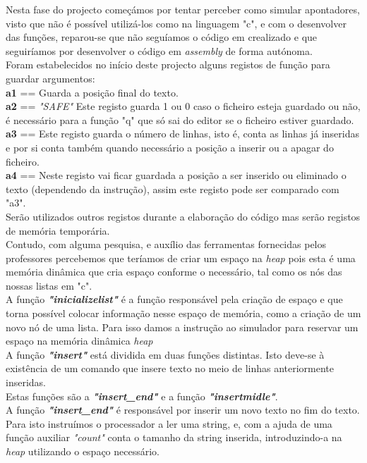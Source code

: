 \documentclass[letterpaper,12pt]{article}
\begin{document}
Nesta fase do projecto começámos por tentar perceber como simular apontadores, visto que não é possível utilizá-los como na linguagem "c", e com o desenvolver das funções, reparou-se que não seguíamos o código em c\newline realizado e que seguiríamos por desenvolver o código em \emph{assembly} de forma autónoma.\\
Foram estabelecidos no início deste projecto alguns registos de função para guardar argumentos:\\
\textbf{a1} == Guarda a posição final do texto.\\
\textbf{a2} == \emph{"SAFE"} Este registo guarda 1 ou 0 caso o ficheiro esteja guardado ou não, é necessário para a função "q" que só sai do editor se o ficheiro estiver guardado.\\
\textbf{a3} == Este registo guarda o número de linhas, isto é, conta as linhas já inseridas e por si conta também quando necessário a posição a inserir ou a apagar do ficheiro.\\
\textbf{a4} == Neste registo vai ficar guardada a posição a ser inserido ou eliminado o texto (dependendo da instrução), assim este registo pode ser comparado com "a3".\\ 
Serão utilizados outros registos durante a elaboração do código mas serão registos de memória temporária.\\
Contudo, com alguma pesquisa, e auxílio das ferramentas fornecidas pelos professores percebemos que teríamos de criar um espaço na \emph{heap} pois esta é uma memória dinâmica que cria espaço conforme o necessário, tal como os nós das nossas listas em "c".\vspace{0.5cm}\\
A função \emph{\textbf{"inicializelist"}} é a função responsável pela criação de espaço e que torna possível colocar informação nesse espaço de memória, como a criação de um novo nó de uma lista.
Para isso damos a instrução ao simulador para reservar um  espaço na memória dinâmica \emph{heap} \vspace{0.5cm}\\
A função \emph{\textbf{"insert"}} está dividida em duas funções distintas. Isto deve-se à     existência de um comando que insere texto no meio de linhas anteriormente inseridas.\\
Estas funções são a \emph{\textbf{"insert\_end"}} e a função \emph{\textbf{"insertmidle"}}.\\
A função \emph{\textbf{"insert\_end"}} é responsável por inserir um novo texto no fim do texto. Para isto instruímos o processador a ler uma string, e, com a ajuda de uma função auxiliar \emph{"count"} conta o tamanho da string inserida, introduzindo-a na \emph{heap} utilizando o espaço necessário.\vspace{0.5cm}\\
\end{document}
